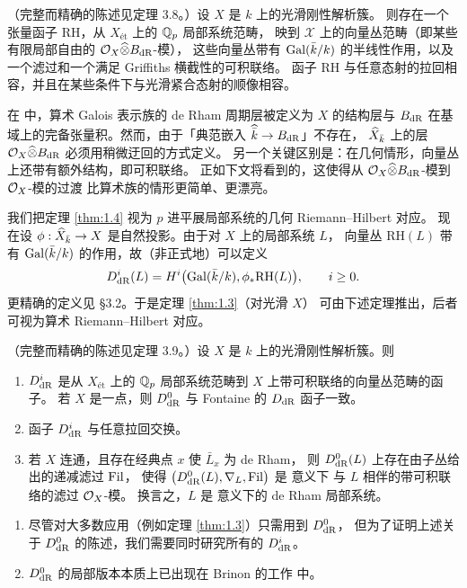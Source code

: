 \begin{thm}\label{thm:1.4}
（完整而精确的陈述见定理 3.8。）设 $X$ 是 $k$ 上的光滑刚性解析簇。
则存在一个张量函子 $\mathrm{RH}$，从 $X_{\text{\'et}}$ 上的 $\mathbb{Q}_p$ 局部系统范畴，
映到 $\mathcal X$ 上的向量丛范畴（即某些有限局部自由的 $\mathcal{O}_X\widehat{\otimes}B_{\mathrm{dR}}$-模），
这些向量丛带有 $\operatorname{Gal}(\bar k/k)$ 的半线性作用，以及一个滤过和一个满足 Griffiths 横截性的可积联络。
函子 $\mathrm{RH}$ 与任意态射的拉回相容，并且在某些条件下与光滑紧合态射的顺像相容。
\end{thm}

\begin{rmk}\label{rmk:1.7}
在 \cite{Be} 中，算术 Galois 表示族的 de Rham 周期层被定义为 $X$ 的结构层与 $B_{\mathrm{dR}}$
在基域上的完备张量积。然而，由于「典范嵌入 $\widehat{\bar k}\to B_{\mathrm{dR}}$」不存在，
$\widehat{X}_{\bar k}$ 上的层 $\mathcal{O}_X\widehat{\otimes}B_{\mathrm{dR}}$ 必须用稍微迂回的方式定义。
另一个关键区别是：在几何情形，向量丛上还带有额外结构，即可积联络。
正如下文将看到的，这使得从 $\mathcal{O}_X\widehat{\otimes}B_{\mathrm{dR}}$-模到 $\mathcal{O}_X$-模的过渡
比算术族的情形更简单、更漂亮。
\end{rmk}

我们把定理 \ref{thm:1.4} 视为 $p$ 进平展局部系统的几何 Riemann--Hilbert 对应。
现在设 $\phi:\widehat{X}_{\bar k}\to X$ 是自然投影。由于对 $X$ 上的局部系统 $L$，
向量丛 $\mathrm{RH}(L)$ 带有 $\operatorname{Gal}(\bar k/k)$ 的作用，故（非正式地）可以定义
\[
  D^i_{\mathrm{dR}}(L)=H^i\bigl(\operatorname{Gal}(\bar k/k),\phi_*\mathrm{RH}(L)\bigr),\qquad i\ge 0.
\]
更精确的定义见 §3.2。于是定理 \ref{thm:1.3}（对光滑 $X$）
可由下述定理推出，后者可视为算术 Riemann--Hilbert 对应。

\begin{thm}\label{thm:1.5}
（完整而精确的陈述见定理 3.9。）设 $X$ 是 $k$ 上的光滑刚性解析簇。则
\begin{enumerate}
\item $D^i_{\mathrm{dR}}$ 是从 $X_{\text{\'et}}$ 上的 $\mathbb{Q}_p$ 局部系统范畴到 $X$ 上带可积联络的向量丛范畴的函子。
若 $X$ 是一点，则 $D^0_{\mathrm{dR}}$ 与 Fontaine 的 $D_{\mathrm{dR}}$ 函子一致。
\item 函子 $D^i_{\mathrm{dR}}$ 与任意拉回交换。
\item 若 $X$ 连通，且存在经典点 $x$ 使 $\bar L_x$ 为 de Rham，
则 $D^0_{\mathrm{dR}}(L)$ 上存在由子丛给出的递减滤过 $\mathrm{Fil}$，
使得 $\bigl(D^0_{\mathrm{dR}}(L),\nabla_L,\mathrm{Fil}\bigr)$ 是 \cite[Definition 7.4]{Sch2} 意义下
与 $L$ 相伴的带可积联络的滤过 $\mathcal{O}_X$-模。
换言之，$L$ 是 \cite[Definition 8.3]{Sch2} 意义下的 de Rham 局部系统。
\end{enumerate}
\end{thm}

\begin{rmk}\label{rmk:1.8}
\begin{enumerate}
\item 尽管对大多数应用（例如定理 \ref{thm:1.3}）只需用到 $D^0_{\mathrm{dR}}$，
但为了证明上述关于 $D^0_{\mathrm{dR}}$ 的陈述，我们需要同时研究所有的 $D^i_{\mathrm{dR}}$。
\item $D^0_{\mathrm{dR}}$ 的局部版本本质上已出现在 Brinon 的工作 \cite{Br2} 中。
\end{enumerate}
\end{rmk}

